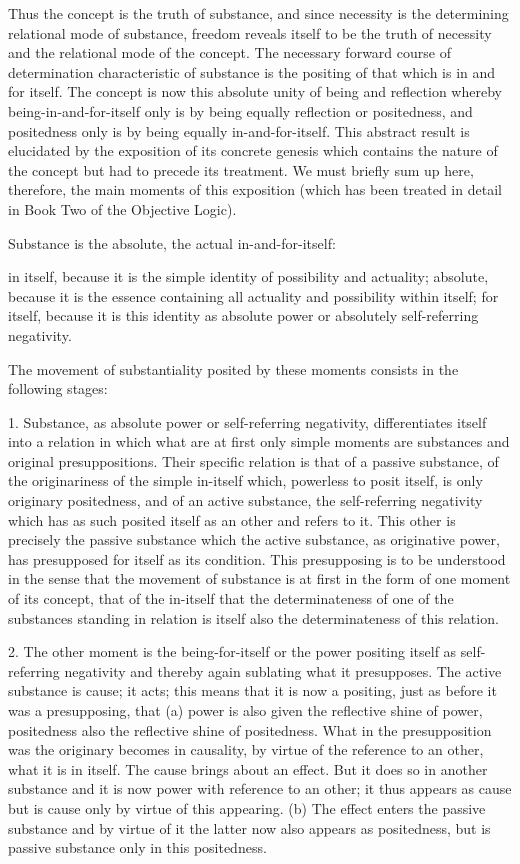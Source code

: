 Thus the concept is the truth of substance,
and since necessity is the
determining relational mode of substance,
freedom reveals itself to be the truth of necessity
and the relational mode of the concept.
The necessary forward course of determination
characteristic of substance is the positing
of that which is in and for itself.
The concept is now this absolute
unity of being and reflection
whereby being-in-and-for-itself
only is by being equally reflection or positedness,
and positedness only is by being equally in-and-for-itself.
This abstract result is elucidated by the
exposition of its concrete genesis
which contains the nature of the concept
but had to precede its treatment.
We must briefly sum up here, therefore,
the main moments of this exposition
(which has been treated in detail in
Book Two of the Objective Logic).

Substance is the absolute,
the actual in-and-for-itself:

in itself, because it is the simple
identity of possibility and actuality;
absolute, because it is the essence containing
all actuality and possibility within itself;
for itself, because it is
this identity as absolute power
or absolutely self-referring negativity.

The movement of substantiality posited by these moments
consists in the following stages:

1. Substance, as absolute power or self-referring negativity,
differentiates itself into a relation in which
what are at first only simple moments
are substances and original presuppositions.
Their specific relation is
that of a passive substance,
of the originariness of the simple in-itself
which, powerless to posit itself, is
only originary positedness,
and of an active substance,
the self-referring negativity
which has as such posited itself as
an other and refers to it.
This other is precisely the passive substance
which the active substance, as originative power,
has presupposed for itself as its condition.
This presupposing is to be understood
in the sense that the movement of substance is
at first in the form of one moment of its concept,
that of the in-itself that the determinateness
of one of the substances standing in relation is
itself also the determinateness of this relation.

2. The other moment is the being-for-itself
or the power positing itself as self-referring negativity
and thereby again sublating what it presupposes.
The active substance is cause; it acts;
this means that it is now a positing,
just as before it was a presupposing, that
(a) power is also given the reflective shine of power,
positedness also the reflective shine of positedness.
What in the presupposition was the originary becomes in causality,
by virtue of the reference to an other, what it is in itself.
The cause brings about an effect.
But it does so in another substance
and it is now power with reference to an other;
it thus appears as cause but is cause
only by virtue of this appearing.
(b) The effect enters the passive substance
and by virtue of it the latter now also appears as positedness,
but is passive substance only in this positedness.

